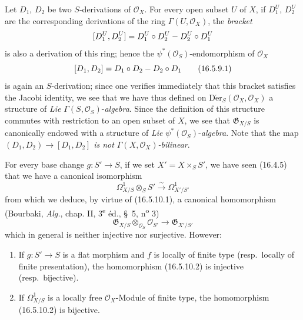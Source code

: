 \begin{env}[16.5.9]
\label{IV.16.5.9}
Let $D_1$, $D_2$ be two $S$-derivations of $\mathcal{O}_X$. For every open
subset $U$ of $X$, if $D_1^U$, $D_2^U$ are the corresponding derivations of
the ring $\Gamma(U,\mathcal{O}_X)$, the \emph{bracket}
\[
  [D_1^U,D_2^U]=D_1^U\circ D_2^U- D_2^U\circ D_1^U
\]
is also a derivation of this ring; hence the
$\psi^*(\mathcal{O}_S)$-endomorphism of $\mathcal{O}_X$
\[
  [D_1,D_2]=D_1\circ D_2- D_2\circ D_1
  \tag{16.5.9.1}
  \label{IV.16.5.9.1}
\]
is again an $S$-derivation; since one verifies immediately that this bracket
satisfies the Jacobi identity, we see that we have thus defined on
$\operatorname{D\acute{e}r}_S(\mathcal{O}_X,\mathcal{O}_X)$ a structure of
\emph{Lie} $\Gamma(S,\mathcal{O}_S)$-\emph{algebra}. Since the definition of this
structure commutes with restriction to an open subset of $X$, we see that
$\mathfrak{G}_{X/S}$ is canonically endowed with a structure of
\emph{Lie} $\psi^*(\mathcal{O}_S)$-\emph{algebra}. Note that the map
$(D_1,D_2)\to[D_1,D_2]$ \emph{is not
$\Gamma(X,\mathcal{O}_X)$-bilinear}.
\end{env}

\begin{env}[16.5.10]
\label{IV.16.5.10}
For every base change $g:S'\to S$, if we set $X'=X\times_S S'$, we
have seen (16.4.5) that we have a canonical isomorphism
\[
  \varOmega_{X/S}^1\otimes_S S'\xrightarrow{\sim}\varOmega_{X'/S'}^1
  \tag{16.5.10.1}
  \label{IV.16.5.10.1}
\]
from which we deduce, by virtue of (16.5.10.1), a canonical homomorphism
(Bourbaki, \emph{Alg.}, chap. II, 3\textsuperscript{e} éd., \S~5,
n\textsuperscript{o} 3)
\[
  \mathfrak{G}_{X/S}\otimes_{\mathcal{O}_S}\mathcal{O}_{S'}
  \longrightarrow\mathfrak{G}_{X'/S'}
  \tag{16.5.10.2}
  \label{IV.16.5.10.2}
\]
which in general is neither injective nor surjective. However:
\end{env}

\begin{proposition}[16.5.11]
\label{IV.16.5.11}
\begin{enumerate}
\item[\textup{(i)}] If $g:S'\to S$ is a flat morphism and $f$ is locally of
finite type \textup{(resp.}\ locally of finite presentation\textup{)}, the homomorphism
\textup{(16.5.10.2)} is injective \textup{(resp.}\ bijective\textup{)}.
\item[\textup{(ii)}] If $\varOmega_{X/S}^1$ is a locally free $\mathcal{O}_X$-Module
of finite type, the homomorphism \textup{(16.5.10.2)} is bijective.
\end{enumerate}
\end{proposition}

